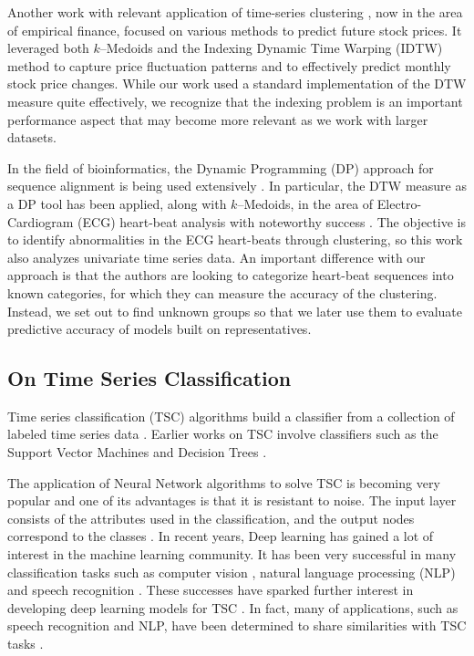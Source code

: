 Another work with relevant application of time-series clustering \cite{Nakagawa2019}, now in the area of empirical finance, focused on various methods to predict future stock prices. It leveraged both $k$--Medoids and the Indexing Dynamic Time Warping (IDTW) method to capture price fluctuation patterns and to effectively predict monthly stock price changes. While our work used a standard implementation of the DTW measure quite effectively, we recognize that the indexing problem is an important performance aspect that may become more relevant as we work with larger datasets.

In the field of bioinformatics, the Dynamic Programming (DP) approach for sequence alignment is being used extensively \cite{Dinov2016}. In particular, the DTW measure as a DP tool has been applied, along with $k$--Medoids, in the area of Electro-Cardiogram (ECG) heart-beat analysis with noteworthy success \cite{Annam2011}. The objective is to identify abnormalities in the ECG heart-beats through clustering, so this work also analyzes univariate time series data. An important difference with our approach is that the authors are looking to categorize heart-beat sequences into known categories, for which they can measure the accuracy of the clustering. Instead, we set out to find unknown groups so that we later use them to evaluate predictive accuracy of models built on representatives.

\subsection{On Time Series Classification}

Time series classification (TSC) algorithms build a classifier from a collection of labeled time series data \cite{Bagnall2017a}. Earlier works on TSC involve classifiers such as the Support Vector Machines \cite{Kampouraki2008, Mitsa2010} and Decision Trees \cite{Douzal2012, Mitsa2010}.

The application of Neural Network algorithms to solve TSC is becoming very popular and one of its advantages is that it is resistant to noise. The input layer consists of the attributes used in the classification, and the output nodes correspond to the classes \cite{Mitsa2010}. In recent years, Deep learning \cite{Charniak2019, Goodfellow2016} has gained a lot of interest in the machine learning community. It has been very successful in many classification tasks such as computer vision \cite{Krizhevsky2017}, natural language processing (NLP) \cite{Bahdanau2015} and speech recognition \cite{Hinton2012}. These successes have sparked further interest in developing deep learning models for TSC \cite{Wang2017, Fawaz2019}. In fact, many of applications, such as speech recognition and NLP, have been determined to share similarities with TSC tasks \cite{Fawaz2019}.


